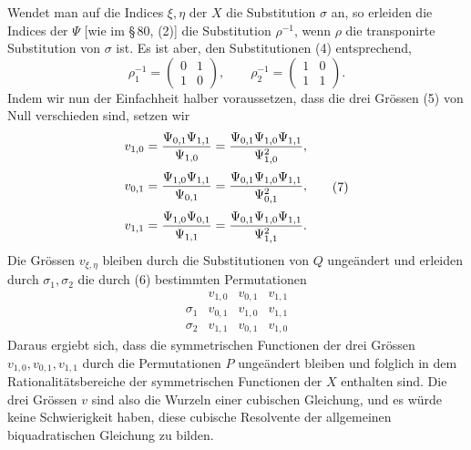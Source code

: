 \documentclass[11pt]{article}
\providecommand{\mat}[4]{\begin{pmatrix}#1&#2\\#3&#4\end{pmatrix}}
\providecommand{\mat}[4]{\begin{pmatrix}#1&#2\\#3&#4\end{pmatrix}}
\providecommand{\mat}[1]{\begin{pmatrix}#1\end{pmatrix}}
\begin{document}
Wendet man auf die Indices $\xi,\eta$ der $X$ die Substitution $\sigma$ an, so erleiden die Indices der $\Psi$ [wie im \S\,80, (2)] die Substitution $\rho^{-1}$, wenn $\rho$ die transponirte Substitution von $\sigma$ ist. Es ist aber, den Substitutionen (4) entsprechend,
\begin{equation}
 \rho_1^{-1}=\mat{0}{1}{1}{0},
 \qquad
 \rho_2^{-1}=\mat{1}{0}{1}{1}.
 \tag{6}
\end{equation}
Indem wir nun der Einfachheit halber voraussetzen, dass die drei Grössen (5) von Null verschieden sind, setzen wir
\begin{equation}
\begin{aligned}
 v_{1,0}&={\Psi_{0,1}\Psi_{1,1}\over\Psi_{1,0}}={\Psi_{0,1}\Psi_{1,0}\Psi_{1,1}\over\Psi_{1,0}^2},\\[0.25em]
 v_{0,1}&={\Psi_{1,0}\Psi_{1,1}\over\Psi_{0,1}}={\Psi_{0,1}\Psi_{1,0}\Psi_{1,1}\over\Psi_{0,1}^2},\\[0.25em]
 v_{1,1}&={\Psi_{1,0}\Psi_{0,1}\over\Psi_{1,1}}={\Psi_{0,1}\Psi_{1,0}\Psi_{1,1}\over\Psi_{1,1}^2}.
\end{aligned}
\tag{7}
\end{equation}
Die Grössen $v_{\xi,\eta}$ bleiben durch die Substitutionen von $Q$ ungeändert und erleiden durch $\sigma_1,\sigma_2$ die durch (6) bestimmten Permutationen
\[
\begin{array}{c|ccc}
&v_{1,0}&v_{0,1}&v_{1,1}\\
\sigma_1&v_{0,1}&v_{1,0}&v_{1,1}\\
\sigma_2&v_{1,1}&v_{0,1}&v_{1,0}
\end{array}
\]
Daraus ergiebt sich, dass die symmetrischen Functionen der drei Grössen $v_{1,0},v_{0,1},v_{1,1}$ durch die Permutationen $P$ ungeändert bleiben und folglich in dem Rationalitätsbereiche der symmetrischen Functionen der $X$ enthalten sind. Die drei Grössen $v$ sind also die Wurzeln einer cubischen Gleichung, und es würde keine Schwierigkeit haben, diese cubische Resolvente der allgemeinen biquadratischen Gleichung zu bilden.
\end{document}
